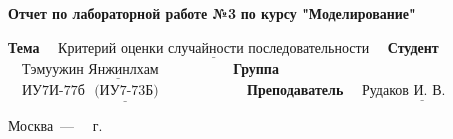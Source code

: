 \begin{titlepage}
    \begin{center}
        \Large\textbf{\hspace{1cm} Отчет по лабораторной работе №3} 
        \newline
        \Large\textbf{по курсу "Моделирование"}

    \end{center}

    \noindent\textbf{Тема} $\underline{\text{~~~Критерий оценки случайности последовательности~~~}}$\newline\newline\newline
    \noindent\textbf{Студент} $\underline{\text{~~~Тэмуужин Янжинлхам~~~~~~~~~~~~~~~}}$\newline\newline
    \noindent\textbf{Группа} $\underline{\text{~~~ИУ7И-77б~~(ИУ7-73Б)~~~~~~~~~~~~~~~~~~}}$\newline\newline
    \noindent\textbf{Преподаватель} $\underline{\text{~~~Рудаков И. В.~~~~~~~~~~~}}$\newline

    \begin{center}
        \vfill
        Москва~---~\the\year
        ~г.
    \end{center}
    \restoregeometry
\end{titlepage}
